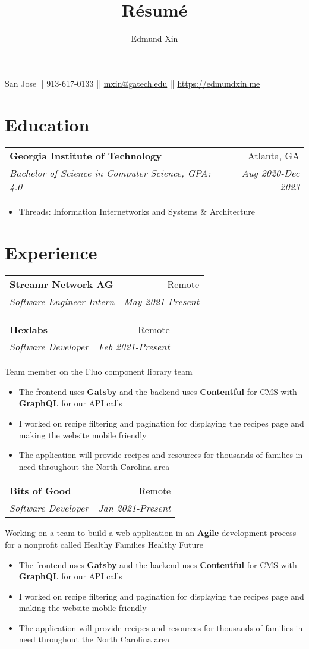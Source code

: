 \documentclass[letterpaper,8pt]{article}
\makeatletter
\renewcommand{\maketitle}{
  \begin{center}
  {\huge\bfseries
  \theauthor}

  \vspace{0.25em}

  San Jose || 913-617-0133 || \href{mailto:mxin@gatech.edu}{mxin@gatech.edu} || \href{https://edmundxin.me}{https://edmundxin.me}

  \end{center}
}
\newcommand{\resumeSubheading}[4]{
  \vspace{0.25em}
  \begin{tabular*}{1\textwidth}[t]{l@{\extracolsep{\fill}}r}
    \textbf{#1} & #2 \\
    \textit{#3} & \textit{#4} \\
  \end{tabular*}\vspace{-5pt}
}
\makeatother
\begin{document}
\title{R\'esum\'e}
\author{Edmund Xin}

\maketitle

\section{Education}

\resumeSubheading{Georgia Institute of Technology}
{Atlanta, GA}{Bachelor of Science in Computer Science, GPA: 4.0
}{Aug 2020-Dec 2023}

\begin{itemize}
    \item Threads: Information Internetworks and Systems & Architecture
\end{itemize}

\section{Experience}
\resumeSubheading{Streamr Network AG}{Remote}{Software Engineer Intern}{May 2021-Present}

\resumeSubheading{Hexlabs}{Remote}{Software Developer}{Feb 2021-Present}

Team member on the Fluo component library team

\begin{itemize}[label=\raisebox{0.25ex}{\tiny$\bullet$}]
    \item The frontend uses \textbf{Gatsby} and the backend uses \textbf{Contentful} for CMS with \textbf{GraphQL} for our API calls
    \item I worked on recipe filtering and pagination for displaying the recipes page and making the website mobile friendly
    \item The application will provide recipes and resources for thousands of families in need throughout the North Carolina area
\end{itemize}
\vspace{3pt}

\resumeSubheading{Bits of Good}{Remote}{Software Developer}{Jan 2021-Present}

Working on a team to build a web application in an \textbf{Agile} development process for a nonprofit called Healthy Families Healthy Future

\begin{itemize}[label=\raisebox{0.25ex}{\tiny$\bullet$}]
    \item The frontend uses \textbf{Gatsby} and the backend uses \textbf{Contentful} for CMS with \textbf{GraphQL} for our API calls
    \item I worked on recipe filtering and pagination for displaying the recipes page and making the website mobile friendly
    \item The application will provide recipes and resources for thousands of families in need throughout the North Carolina area
\end{itemize}
\vspace{3pt}
\end{document}
